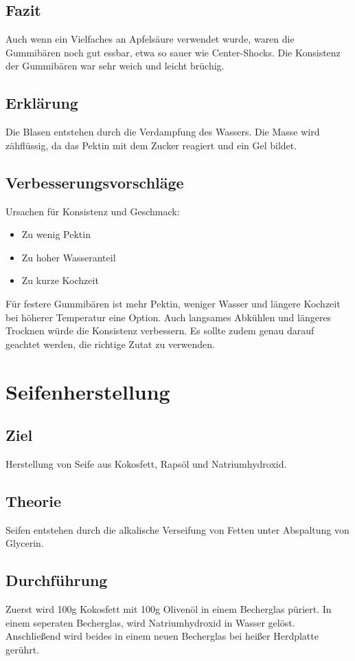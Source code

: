 \documentclass{article}
\begin{document}
    \subsection{Fazit}
    Auch wenn ein Vielfaches an Apfelsäure verwendet wurde, waren die Gummibären noch gut essbar,
    etwa so sauer wie Center-Shocks.
    Die Konsistenz der Gummibären war sehr weich und leicht brüchig.

    \subsection{Erklärung}
    Die Blasen entstehen durch die Verdampfung des Wassers.
    Die Masse wird zähflüssig, da das Pektin mit dem Zucker reagiert und ein Gel bildet.

    \subsection{Verbesserungsvorschläge}
    Ursachen für Konsistenz und Geschmack:

    \begin{itemize}
        \item Zu wenig Pektin
        \item Zu hoher Wasseranteil
        \item Zu kurze Kochzeit
    \end{itemize}
    Für festere Gummibären ist mehr Pektin, weniger Wasser und längere Kochzeit bei höherer Temperatur eine Option.
    Auch langsames Abkühlen und längeres Trocknen würde die Konsistenz verbessern.
    Es sollte zudem genau darauf geachtet werden, die richtige Zutat zu verwenden.

    \section{Seifenherstellung}

    \subsection{Ziel}
    Herstellung von Seife aus Kokosfett, Rapsöl und Natriumhydroxid.

    \subsection{Theorie}
    Seifen entstehen durch die alkalische Verseifung von Fetten unter Abspaltung von Glycerin.

    \subsection{Durchführung}
    Zuerst wird 100g Kokosfett mit 100g Olivenöl in einem Becherglas püriert.
    In einem seperaten Becherglas, wird Natriumhydroxid in Wasser gelöst.
    Anschließend wird beides in einem neuen Becherglas bei heißer Herdplatte gerührt.
\end{document}
